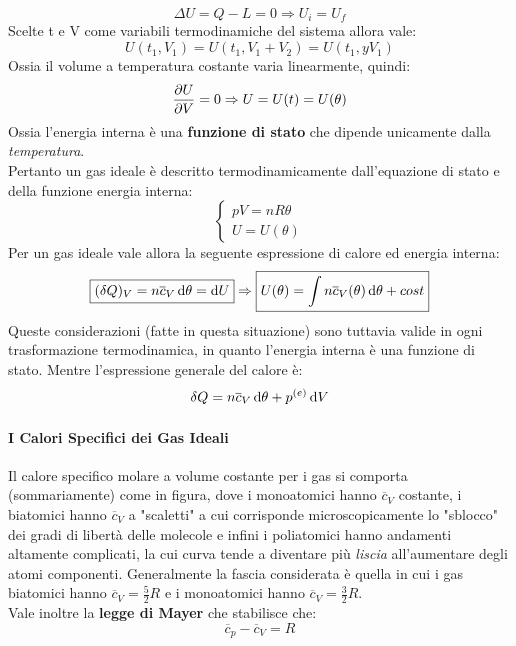 \documentclass{article}
\newcommand{\then}{\ensuremath{\Rightarrow}}
\begin{document}
\[\Delta U=Q-L=0\then U_i=U_f\]
Scelte t e V come variabili termodinamiche del sistema allora vale:
\[U(t_1,V_1)=U(t_1,V_1+V_2)=U(t_1,yV_1)\]
Ossia il volume a temperatura costante varia linearmente, quindi:
\[\pdv{U}{V}=0\then U=U(t)=U(\theta)\]
Ossia l'energia interna è una \textbf{funzione di stato} che dipende unicamente dalla \textit{temperatura}.\\
Pertanto un gas ideale è descritto termodinamicamente dall'equazione di stato e della funzione energia interna:
\begin{equation}
\begin{cases}
pV=nR\theta\\
U=U(\theta)
\end{cases}
\end{equation}
Per un gas ideale vale allora la seguente espressione di calore ed energia interna:
\begin{equation}
\boxed{(\delta Q)_V=n\overline{c}_V\dif\theta=\dif U}\then \boxed{U(\theta)=\int n\overline{c}_V(\theta)\dif\theta+cost}
\end{equation}
Queste considerazioni (fatte in questa situazione) sono tuttavia valide in ogni trasformazione termodinamica, in quanto l'energia interna è una funzione di stato. Mentre l'espressione generale del calore è:
\[\delta Q=n\overline{c}_V\dif\theta+p^{(e)}\dif V\]

\paragraph{I Calori Specifici dei Gas Ideali}
Il calore specifico molare a volume costante per i gas si comporta (sommariamente) come in figura, dove i monoatomici hanno $\overline{c}_V$ costante, i biatomici hanno $\overline{c}_V$ a "scaletti" a cui corrisponde microscopicamente lo "sblocco" dei gradi di libertà delle molecole e infini i poliatomici hanno andamenti altamente complicati, la cui curva tende a diventare più \textit{liscia} all'aumentare degli atomi componenti. Generalmente la fascia considerata è quella in cui i gas biatomici hanno $\overline{c}_V=\frac{5}{2}R$ e i monoatomici hanno $\overline{c}_V=\frac{3}{2}R$.\\
Vale inoltre la \textbf{legge di Mayer} che stabilisce che:
\begin{equation}
\boxed{\overline{c}_p-\overline{c}_V=R}
\end{equation}
\end{document}
